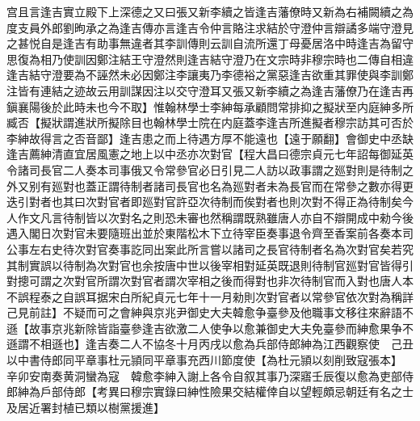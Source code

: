 宫且言逢吉實立殿下上深德之又曰張又新李續之皆逢吉藩僚時又新為右補闕續之為度支員外郎劉昫承之為逢吉傳亦言逢吉令仲言賂注求結於守澄仲言辯譎多端守澄見之甚悦自是逢吉有助事無違者其李訓傳則云訓自流所還丁母憂居洛中時逢吉為留守思復為相乃使訓因鄭注結王守澄然則逢吉結守澄乃在文宗時非穆宗時也二傳自相違逢吉結守澄要為不誣然未必因鄭注李讓夷乃李德裕之黨惡逢吉欲重其罪使與李訓鄭注皆有連結之迹故云用訓謀因注以交守澄耳又張又新李續之為逢吉藩僚乃在逢吉再鎭襄陽後於此時未也今不取】惟翰林學士李紳每承顧問常排抑之擬狀至内庭紳多所臧否【擬狀謂進狀所擬除目也翰林學士院在内庭蓋李逢吉所進擬者穆宗訪其可否於李紳故得言之否音鄙】逢吉患之而上待遇方厚不能遠也【遠于願翻】會御史中丞缺逢吉薦紳清直宜居風憲之地上以中丞亦次對官【程大昌曰德宗貞元七年詔每御延英令諸司長官二人奏本司事俄又令常參官必日引見二人訪以政事謂之廵對則是待制之外又别有廵對也蓋正謂待制者諸司長官也名為廵對者未為長官而在常參之數亦得更迭引對者也其曰次對官者即廵對官許亞次待制而俟對者也則次對不得正為待制矣今人作文凡言待制皆以次對名之則恐未審也然稱謂既熟雖唐人亦自不辯開成中勑今後遇入閣日次對官未要隨班出並於東階松木下立待宰臣奏事退令齊至香案前各奏本司公事左右史待次對官奏事訖同出案此所言嘗以諸司之長官待制者名為次對官矣若究其制實誤以待制為次對官也余按唐中世以後宰相對延英既退則待制官廵對官皆得引對摠可謂之次對官所謂次對官者謂次宰相之後而得對也非次待制官而入對也唐人本不誤程泰之自誤耳据宋白所紀貞元七年十一月勑則次對官者以常參官依次對為稱詳己見前註】不疑而可之會紳與京兆尹御史大夫韓愈争臺參及他職事文移往來辭語不遜【故事京兆新除皆詣臺參逢吉欲激二人使争以愈兼御史大夫免臺參而紳愈果争不遜謂不相遜也】逢吉奏二人不協冬十月丙戌以愈為兵部侍郎紳為江西觀察使　己丑以中書侍郎同平章事杜元頴同平章事充西川節度使【為杜元頴以刻削致寇張本】　辛卯安南奏黄洞蠻為寇　韓愈李紳入謝上各令自叙其事乃深寤壬辰復以愈為吏部侍郎紳為戶部侍郎【考異曰穆宗實錄曰紳性險果交結權倖自以望輕頗忌朝廷有名之士及居近署封植已類以樹黨援進】

